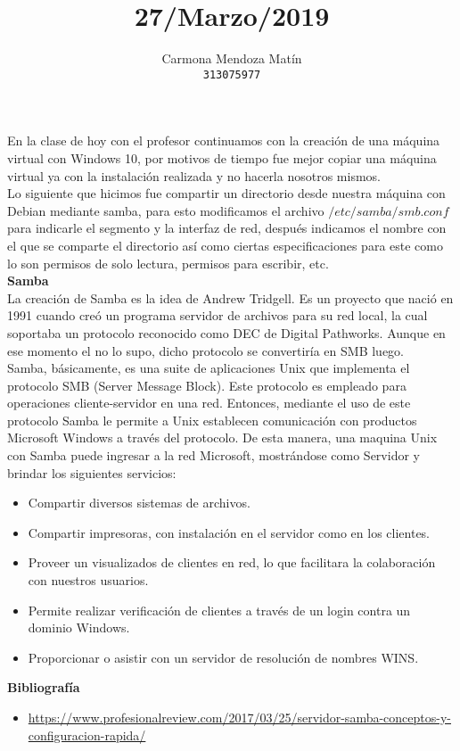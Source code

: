 \documentclass[11pt, a4paper]{report}
\begin{document}
\title{27/Marzo/2019}
\author{
  Carmona Mendoza Mat\'in\\
  \texttt{313075977}
}
\date{}
\maketitle

En la clase de hoy con el profesor continuamos con la creación de una máquina
virtual con Windows 10, por motivos de tiempo fue mejor copiar una máquina virtual ya con la instalación realizada y no hacerla nosotros mismos. \\

Lo siguiente que hicimos fue compartir un directorio desde nuestra máquina con
Debian mediante samba, para esto modificamos el archivo $/etc/samba/smb.conf$
para indicarle el segmento y la interfaz de red, después indicamos el nombre
con el que se comparte el directorio así como ciertas especificaciones para
este como lo son permisos de solo lectura, permisos para escribir, etc. \\

\textbf{Samba} \\

La creación de Samba es la idea de Andrew Tridgell. Es un proyecto que nació en
1991 cuando creó un programa servidor de archivos para su red local, la cual
soportaba un protocolo reconocido como DEC de Digital Pathworks. Aunque en ese
momento el no lo supo, dicho protocolo se convertiría en SMB luego. \\

Samba, básicamente, es una suite de aplicaciones Unix que implementa el
protocolo SMB (Server Message Block). Este protocolo es empleado para
operaciones cliente-servidor en una red. Entonces, mediante el uso de este
protocolo Samba le permite a Unix establecen comunicación con productos
Microsoft Windows a través del protocolo. De esta manera, una maquina Unix con
Samba puede ingresar a la red Microsoft, mostrándose como Servidor y brindar
los siguientes servicios:

\begin{itemize}
\item Compartir diversos sistemas de archivos.
\item Compartir impresoras, con instalación en el servidor como en los clientes.
\item Proveer un visualizados de clientes en red, lo que facilitara la colaboración con nuestros usuarios.
\item Permite realizar verificación de clientes a través de un login contra un dominio Windows.
\item Proporcionar o asistir con un servidor de resolución de nombres WINS.
\end{itemize}

\newpage

\textbf{Bibliografía} \\

\begin{itemize}

\item \url{https://www.profesionalreview.com/2017/03/25/servidor-samba-conceptos-y-configuracion-rapida/}


\end{itemize}
\end{document}
